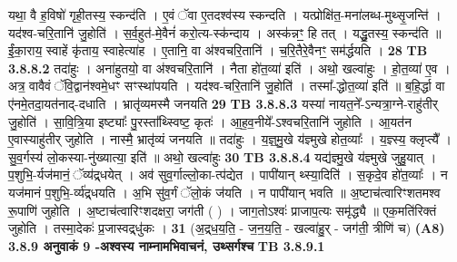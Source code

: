 \documentclass[17pt]{extarticle}
\begin{document}
{{{{{{{{{{{{{{{{{{{{{{                  यथा॒ वै ह॒विषो॑ गृही॒तस्य॒ स्कन्द॑ति । ए॒वं ॅवा ए॒तदश्व॑स्य स्कन्दति । यत्प्रोक्षि॑त॒-मना॑लब्ध-मुथ्सृ॒जन्ति॑ । यद॑श्व-चरि॒तानि॑ जु॒होति॑ । स॒र्व॒हुत॑-मे॒वैनं॑ करो॒त्य-स्क॑न्दाय । अस्क॑न्नꣳ॒॒ हि तत् । यद्धु॒तस्य॒ स्कन्द॑ति ॥ ईं॒का॒राय॒ स्वाहें कृ॑ताय॒ स्वाहेत्या॑ह । ए॒तानि॒ वा अ॑श्वचरि॒तानि॑ । च॒रि॒तैरे॒वैनꣳ॒॒ सम॑र्द्धयति । \textbf{ 28} \newline
                  \newline
                                \textbf{ TB 3.8.8.2} \newline
                  तदा॑हुः । अना॑हुतयो॒ वा अ॑श्वचरि॒तानि॑ । नैता हो॑त॒व्या॑ इति॑ । अथो॒ खल्वा॑हुः । हो॒त॒व्या॑ ए॒व । अत्र॒ वावैवं ॅवि॒द्वान॑श्वमे॒धꣳ सꣳस्था॑पयति । यद॑श्व-चरि॒तानि॑ जु॒होति॑ । तस्मा᳚-द्धोत॒व्या॑ इति॑ ॥ ब॒हि॒र्द्धा वा ए॑नमे॒तदा॒यत॑नाद्-दधाति । भ्रातृ॑व्यमस्मै जनयति \textbf{ 29} \newline
                  \newline
                                \textbf{ TB 3.8.8.3} \newline
                  यस्या॑ नायत॒ने᳚-ऽन्यत्रा॒ग्ने-राहु॑तीर् जु॒होति॑ । सा॒वि॒त्रि॒या इष्ट्याः᳚ पु॒रस्ता᳚थ्स्विष्ट॒ कृतः॑ । आ॒ह॒व॒नीये᳚-ऽश्वचरि॒तानि॑ जुहोति । आ॒यत॑न ए॒वास्याहु॑तीर् जुहोति । नास्मै॒ भ्रातृ॑व्यं जनयति ॥ तदा॑हुः । य॒ज्ञ्॒मु॒खे य॑ज्ञ्मुखे होत॒व्याः᳚ । य॒ज्ञ्स्य॒ क्लृप्त्यै᳚ । सु॒व॒र्गस्य॑ लो॒कस्या-नु॑ख्यात्या॒ इति॑ ॥ अथो॒ खल्वा॑हुः \textbf{ 30} \newline
                  \newline
                                \textbf{ TB 3.8.8.4} \newline
                  यद्य॑ज्ञ्मु॒खे य॑ज्ञ्मुखे जुहु॒यात् । प॒शुभि॒-र्यज॑मानं॒ ॅव्य॑द्र्धयेत् । अव॑ सुव॒र्गाल्लो॒का-त्प॑द्येत । पापी॑यान् थ्स्या॒दिति॑ । स॒कृदे॒व हो॑त॒व्याः᳚ । न यज॑मानं प॒शुभि॒-र्व्य॑द्र्धयति । अ॒भि सु॑व॒र्गं ॅलो॒कं ज॑यति । न पापी॑यान् भवति ॥ अ॒ष्टाच॑त्वारिꣳशतमश्व रू॒पाणि॑ जुहोति । अ॒ष्टाच॑त्वारिꣳशदक्षरा॒ जग॑ती ( ) । जाग॒तोऽश्वः॑ प्राजाप॒त्यः समृ॑द्ध्यै ॥ एक॒मति॑रिक्तं जुहोति । तस्मा॒देकः॑ प्र॒जास्वद्र्धु॑कः । \textbf{ 31} \newline
                  \newline
                                    (अ॒द्र्ध॒य॒ति॒ - ज॒न॒य॒ति॒ - खल्वा॑हु॒र् - जग॑ती॒ त्रीणि॑ च) \textbf{(A8)} \newline \newline
                \textbf{ 3.8.9     अनुवाकं   9 -अश्वस्य नाम्नामभिवाचनं, उथ्सर्गश्च} \newline
                                \textbf{ TB 3.8.9.1} \newline
}}}}}}}}}}}}}}}}}}}}}}
\end{document}
